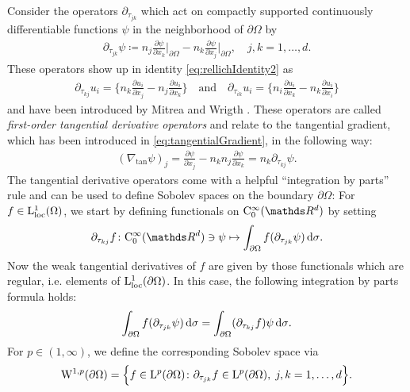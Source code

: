 Consider the operators $\partial_{\tau_{jk}}$ which act on compactly supported continuously differentiable functions $\psi$ in the neighborhood of $\partial\Omega$ by
\begin{align}
  \label{eq:defnTangDerivative}
  \partial_{\tau_{jk}} \psi \coloneqq n_j \frac{\partial \psi}{\partial x_k} \bigg|_{\partial\Omega} - n_k \frac{\partial \psi}{\partial x_j} \bigg|_{\partial\Omega}, \quad j,k = 1,\dots,d.
\end{align}
These operators show up in identity \eqref{eq:rellichIdentity2} as
\begin{align*}
  \partial_{\tau_{kj}} u_i = \Big\{ n_k \frac{\partial u_i}{\partial x_j} - n_j \frac{\partial u_i}{\partial x_k} \Big\}
  \quad\text{and}\quad
  \partial_{\tau_{ik}} u_i =  \Big\{ n_i \frac{\partial u_i}{\partial x_k} - n_k \frac{\partial u_i}{\partial x_i} \Big\}
\end{align*}
and have been introduced by Mitrea and Wrigth \cite[p. 16]{mitreaWright}. 
These operators are called \emph{first-order tangential derivative operators} and relate to the tangential gradient, which has been introduced in 
\eqref{eq:tangentialGradient}, in the following way:
\begin{align}
  \label{eq:relTanGrad}
  (\nabla_{\mathrm{tan}} \psi)_j = \frac{\partial \psi}{\partial x_j} - n_k n_j \frac{\partial \psi}{\partial x_k} = n_k \partial_{\tau_{kj}} \psi.
\end{align}
The tangential derivative operators come with a helpful  ``integration by parts'' rule and can be used to define Sobolev spaces on the boundary $\partial\Omega$:
For $f \in \mathrm{L}^1_{\mathrm{loc}}(\Omega)$, we start by defining functionals on $\CC_0^\infty(\R^d)$ by setting
\begin{align*}
  \partial_{\tau_{kj}} f \colon \CC_0^\infty(\R^d) \ni \psi \mapsto \int_{\partial\Omega} f ( \partial_{\tau_{jk}} \psi) \d\sigma.
\end{align*}
Now the weak tangential derivatives of $f$ are given by those functionals which are regular, i.e. elements of $\mathrm{L}^1_{\mathrm{loc}}(\partial\Omega)$.
In this case, the following integration by parts formula holds:
\begin{align*}
  \int_{\partial\Omega} f ( \partial_{\tau_{jk}} \psi) \, {\operatorname{d}\!{\sigma}} = \int_{\partial\Omega} (\partial_{\tau_{kj}} f) \psi \, {\operatorname{d}\!{\sigma}}.
\end{align*}
For $p \in (1,\infty)$, we define the corresponding Sobolev space via
\begin{align*}
  \mathrm{W}^{1,p}(\partial\Omega) = \Big\{ f \in \mathrm{L}^p(\partial\Omega) \colon \partial_{\tau_{jk}} f \in \mathrm{L}^p(\partial\Omega), \; j,k = 1,\dots,d \Big\}.
\end{align*}


